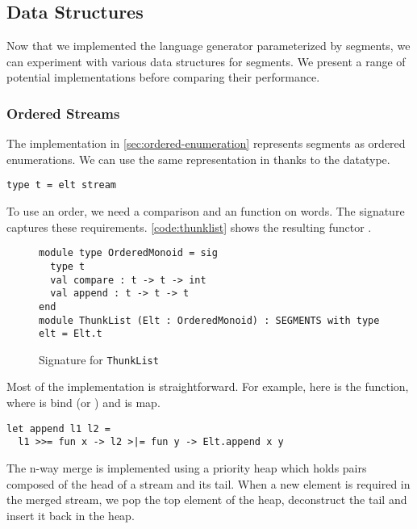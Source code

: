 \subsection{Data Structures}

Now that we implemented the language generator parameterized by segments, we can
experiment with various data structures for segments. We present a
range of potential implementations before comparing their performance.

\subsubsection{Ordered Streams}

The \haskell implementation in \autoref{sec:ordered-enumeration}
represents segments as ordered enumerations. We can use
the same representation in \ocaml thanks to the  datatype.
\begin{lstlisting}[numbers=none]
type t = elt stream
\end{lstlisting}

To use an order, we need a comparison and an
 function on words.  The  signature
captures these requirements. \autoref{code:thunklist} shows the
resulting functor .

\begin{figure}[hbt]
  \centering
\begin{lstlisting}
module type OrderedMonoid = sig
  type t
  val compare : t -> t -> int
  val append : t -> t -> t
end
module ThunkList (Elt : OrderedMonoid) : SEGMENTS with type elt = Elt.t
\end{lstlisting}
  \caption{Signature for \texttt{ThunkList}}
  \label{code:thunklist}
\end{figure}

Most of the implementation is straightforward. For example, here is the
 function, where \code{>>=} is bind (or )
and \code{>|=} is map.

\begin{lstlisting}
let append l1 l2 =
  l1 >>= fun x -> l2 >|= fun y -> Elt.append x y
\end{lstlisting}

The n-way merge is implemented using a priority heap which holds pairs composed
of the head of a stream and its tail. When a new element is required in the
merged stream, we pop the top element of the heap, deconstruct
the tail and insert it back in the heap.

